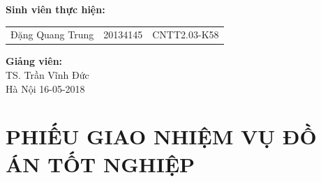 \documentclass[a4paper,12pt]{report}
\begin{document}
\begin{center}
\hspace{-5cm}\fontsize{14}{16}\selectfont \textbf{Sinh viên thực hiện:}\\[0.1cm] 
\begin{longtable}{l c c}
Đặng Quang Trung & 20134145 & CNTT2.03-K58 
\end{longtable}
\vspace{0.3cm}
\hspace{-8.5cm}\fontsize{14}{16}\selectfont \textbf{Giảng viên:}\\[0.1cm]
\hspace{-2.7cm}\fontsize{14}{16}\selectfont TS. Trần Vĩnh Đức \\[3cm]
\fontsize{16}{19}\selectfont Hà Nội 16-05-2018
\end{center}
\chapter*{\centering \Large{PHIẾU GIAO NHIỆM VỤ ĐỒ ÁN TỐT NGHIỆP}}
\end{document}
